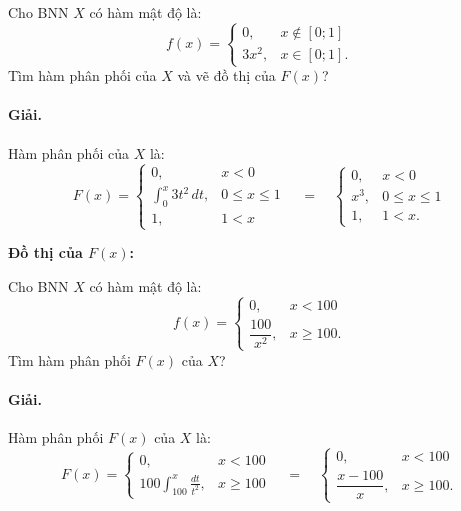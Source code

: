 \begin{vidu}[VD 2]
Cho BNN $X$ có hàm mật độ là:
\[
f(x) = \begin{cases}
0, & x \notin [0; 1] \\
3x^2, & x \in [0; 1].
\end{cases}
\]
Tìm hàm phân phối của $X$ và vẽ đồ thị của $F(x)$?

\paragraph{Giải.} Hàm phân phối của $X$ là:
\[
F(x) = \begin{cases}
0, & x < 0 \\
\displaystyle\int_0^x 3t^2\,dt, & 0 \le x \le 1 \\
1, & 1 < x
\end{cases}
\quad = \quad
\begin{cases}
0, & x < 0 \\
x^3, & 0 \le x \le 1 \\
1, & 1 < x.
\end{cases}
\]

\textbf{Đồ thị của $F(x)$:}
\begin{center}
\end{center}
\end{vidu}

\begin{vidu}[VD 3]
Cho BNN $X$ có hàm mật độ là:
\[
f(x) = \begin{cases}
0, & x < 100 \\
\dfrac{100}{x^2}, & x \ge 100.
\end{cases}
\]
Tìm hàm phân phối $F(x)$ của $X$?

\paragraph{Giải.} Hàm phân phối $F(x)$ của $X$ là:
\[
F(x) = \begin{cases}
0, & x < 100 \\
100 \displaystyle\int_{100}^x \frac{dt}{t^2}, & x \ge 100
\end{cases}
\quad = \quad
\begin{cases}
0, & x < 100 \\
\dfrac{x - 100}{x}, & x \ge 100.
\end{cases}
\]
\end{vidu}

